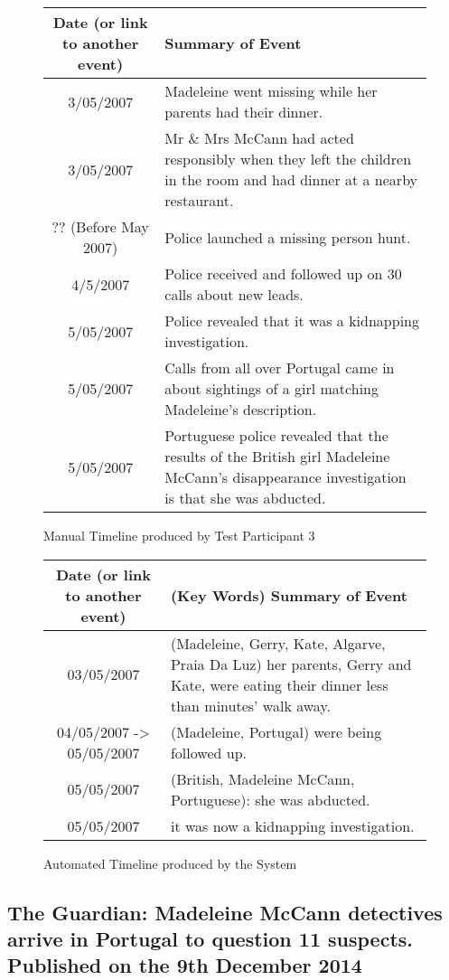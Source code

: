 \begin{figure}[H]
\begin{tabular}{|c|p{7cm}|}
\hline
Date (or link to another event) & Summary of Event\\
\hline
\hline
3/05/2007 & Madeleine went missing while her parents had their dinner.\\
\hline
3/05/2007 & Mr \& Mrs McCann had acted responsibly when they left the children in the room and had dinner at a nearby restaurant.\\
\hline
?? (Before May 2007) & Police launched a missing person hunt.\\
\hline
4/5/2007 & Police received and followed up on 30 calls about new leads.\\
\hline
5/05/2007 & Police revealed that it was a kidnapping investigation.\\
\hline
5/05/2007 & Calls from all over Portugal came in about sightings of a girl matching Madeleine's description.\\
\hline
5/05/2007 & Portuguese police revealed that the results of the British girl Madeleine McCann's disappearance investigation is that she was abducted.\\
\hline
\end{tabular}
\caption{Manual Timeline produced by Test Participant 3}
\end{figure}

\begin{figure}[H]
\begin{tabular}{|c|p{7cm}|}
\hline
Date (or link to another event) & (Key Words)  Summary of Event\\
\hline
\hline
03/05/2007& (Madeleine, Gerry, Kate, Algarve, Praia Da Luz) her parents, Gerry and Kate, were eating their dinner less than minutes' walk away.\\
\hline
04/05/2007 -> 05/05/2007 & (Madeleine, Portugal) were being followed up.\\
\hline
05/05/2007 & (British, Madeleine McCann, Portuguese): she was abducted.\\
\hline
05/05/2007 & it was now a kidnapping investigation.\\
\hline
\end{tabular}
\caption{Automated Timeline produced by the System}
\end{figure}

\subsection{The Guardian: Madeleine McCann detectives arrive in Portugal to question 11 suspects. Published on the 9th December 2014}

